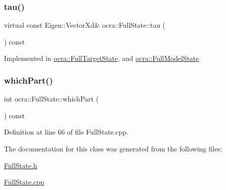 \subsubsection{\texorpdfstring{tau()}{tau()}}
{\footnotesize\ttfamily virtual const Eigen\+::\+Vector\+Xd\& ocra\+::\+Full\+State\+::tau (\begin{DoxyParamCaption}{ }\end{DoxyParamCaption}) const\hspace{0.3cm}{\ttfamily [pure virtual]}}



Implemented in \hyperlink{classocra_1_1FullTargetState_a56855f5d42e84f456a89fd259c4b7edb}{ocra\+::\+Full\+Target\+State}, and \hyperlink{classocra_1_1FullModelState_aa774cf6a9a50ed4b50c037ae981d2c7b}{ocra\+::\+Full\+Model\+State}.

\hypertarget{classocra_1_1FullState_a75ec7c039df8cb8608ebf34f7b779be5}{}\label{classocra_1_1FullState_a75ec7c039df8cb8608ebf34f7b779be5} 
\subsubsection{\texorpdfstring{which\+Part()}{whichPart()}}
{\footnotesize\ttfamily int ocra\+::\+Full\+State\+::which\+Part (\begin{DoxyParamCaption}{ }\end{DoxyParamCaption}) const\hspace{0.3cm}{\ttfamily [protected]}}



Definition at line 66 of file Full\+State.\+cpp.



The documentation for this class was generated from the following files\+:\begin{DoxyCompactItemize}
\item 
\hyperlink{FullState_8h}{Full\+State.\+h}\item 
\hyperlink{FullState_8cpp}{Full\+State.\+cpp}\end{DoxyCompactItemize}
